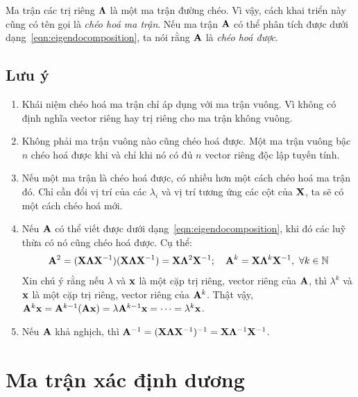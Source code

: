Ma trận các trị riêng $\boldsymbol{\Lambda}$ là một ma trận đường chéo. Vì vậy, cách khai
triển này cũng có tên gọi là \textit{chéo hoá ma trận}. Nếu ma trận $\mathbf{A}$ có thể
phân tích được dưới dạng~\eqref{eqn:eigendocomposition}, ta nói rằng $\mathbf{A}$ là
\textit{chéo hoá được}.

\subsection{Lưu ý} %
\label{sub:luu y}

\begin{enumerate}

\item Khái niệm chéo hoá ma trận chỉ áp dụng với ma trận vuông. Vì không có
định nghĩa vector riêng hay trị riêng cho ma trận không vuông.

\item Không phải ma trận vuông nào cũng chéo hoá được. Một ma trận
vuông bậc $n$ chéo hoá được khi và chỉ khi nó có đủ $n$ vector riêng độc lập
tuyến tính.

\item Nếu một ma trận là chéo hoá được, có nhiều hơn một cách chéo hoá ma
trận đó. Chỉ cần đổi vị trí của các $\lambda_i$ và vị trí tương ứng
các cột của $\mathbf{X}$, ta sẽ có một cách chéo hoá mới.

\item Nếu $\mathbf{A}$ có thể viết được dưới dạng~\eqref{eqn:eigendocomposition},
khi đó các luỹ thừa có nó cũng chéo hoá được. Cụ thể:
\begin{equation}
\mathbf{A}^2 = (\mathbf{X} \boldsymbol{\Lambda} \mathbf{X}^{-1})(\mathbf{X} \boldsymbol{\Lambda} \mathbf{X}^{-1}) =
\mathbf{X}\boldsymbol{\Lambda}^2\mathbf{X}^{-1}; \quad \mathbf{A}^k = \mathbf{X} \boldsymbol{\Lambda}^k \mathbf{X}^{-1}, ~\forall k \in
\mathbb{N}
\end{equation}
Xin chú ý rằng nếu $\lambda$ và $\mathbf{x}$ là một cặp trị riêng, vector riêng
của $\mathbf{A}$, thì $\lambda^k$ và $\mathbf{x}$ là một cặp  trị riêng, vector riêng
của $\mathbf{A}^k$. Thật vậy, $\mathbf{A}^k \mathbf{x} = \mathbf{A}^{k-1}(\mathbf{A}\mathbf{x}) = \lambda \mathbf{A}^
{k-1}\mathbf{x} = \dots = \lambda^k \mathbf{x}$.

\item Nếu $\mathbf{A}$ khả nghịch, thì $\mathbf{A}^{-1} = (\mathbf{X} \boldsymbol{\Lambda} \mathbf{X}^{-1})^{-1} =
\mathbf{X} \boldsymbol{\Lambda}^{-1}\mathbf{X}^{-1}$.
\end{enumerate}


\section{Ma trận xác định dương} %
\label{sec:ma_tran_xac_dinh_duong}

